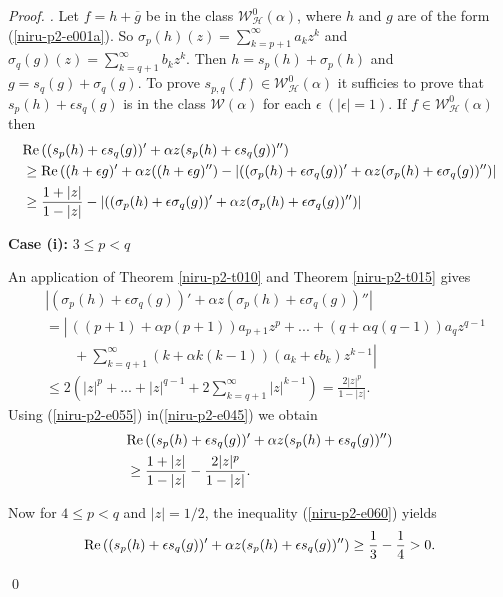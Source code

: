 \documentclass[a4paper,12pt]{amsart}
\theoremstyle{plain}
\theoremstyle{definition}
\newenvironment{pf}[1][]{ \vskip 3mm
 \noindent
 \ifthenelse{\equal{#1}{}}  {{\slshape Proof. }}  {{\slshape #1.} } }{\qed\bigskip}
\begin{document}
\begin{pf}
Let $f  = h + \overline{g}$ be in the class $\mathcal{W}^0_{\mathcal{H}}(\alpha)$, where $h$ and $g$ are of the form (\ref{niru-p2-e001a}). So $\sigma_p(h)(z) = \sum_{k = p + 1}^{\infty}a_k z^k$ and $\sigma_q(g)(z) = \sum_{k = q + 1}^{\infty}b_k z^k$. Then
$h = s_p(h) + \sigma_p(h)$ and $g = s_q(g) + \sigma_q(g)$. To prove $s_{p,q}(f)\in\mathcal{W}^0_{\mathcal{H}}(\alpha)$ it sufficies to prove that
$ s_p(h) + \epsilon s_q(g)$ is in the class $\mathcal{W}(\alpha)$ for each $\epsilon~ (|\epsilon| = 1).$
If $f\in\mathcal{W}^0_{\mathcal{H}}(\alpha)$ then
\begin{align}\label{niru-p2-e045}
&{\rm Re\,}((s_p(h) + \epsilon s_q(g))' + \alpha z (s_p(h) + \epsilon s_q(g))'')\\\nonumber
&\geq{\rm Re\,}((h + \epsilon g)' + \alpha z ((h + \epsilon g)'') - |((\sigma_p(h) + \epsilon \sigma_q(g))' + \alpha z (\sigma_p(h) + \epsilon \sigma_q(g))'')|\\\nonumber
& \geq \frac{1 + |z|}{1 - |z|} - |((\sigma_p(h) + \epsilon \sigma_q(g))' + \alpha z (\sigma_p(h) + \epsilon \sigma_q(g))'')|
\end{align}

{\bf Case (i):}  $3 \leq p < q$

An application of Theorem \ref{niru-p2-t010} and Theorem \ref{niru-p2-t015} gives
\begin{align}\label{niru-p2-e055}
&|(\sigma_p(h) + \epsilon \sigma_q(g))' + \alpha z (\sigma_p(h) + \epsilon \sigma_q(g))''|\\\nonumber
& = \left|\frac{}{}((p + 1)+ \alpha p (p+1)) a_{p+1}z^p +...+ (q + \alpha q (q-1)) a_q z^{q-1}\right. \\\nonumber
&\quad\quad + \left.\sum_{k = q+1}^{\infty} (k + \alpha k (k-1))(a_k + \epsilon b_k)z^{k-1}\right| \\\nonumber
& \leq 2 (|z|^p + ... + |z|^{q -1} + 2 \sum_{k = q+1}^{\infty}|z|^{k - 1} ) = \frac{2 |z|^p}{1 - |z|}.
\end{align}
Using (\ref{niru-p2-e055}) in(\ref{niru-p2-e045}) we obtain
\begin{align}\label{niru-p2-e060}
&{\rm Re\,}((s_p(h) + \epsilon s_q(g))' + \alpha z (s_p(h) + \epsilon s_q(g))'')\\\nonumber
&\geq \frac{1 + |z|}{1 - |z|} - \frac{2 |z|^p}{1 - |z|}.
\end{align}

Now for $4 \leq p < q $ and $|z|= 1/2$, the inequality (\ref{niru-p2-e060}) yields
$$
{\rm Re\,}((s_p(h) + \epsilon s_q(g))' + \alpha z (s_p(h) + \epsilon s_q(g))'') \geq \frac{1}{3} - \frac{1}{4} > 0.
$$


\end{pf}
\end{document}
